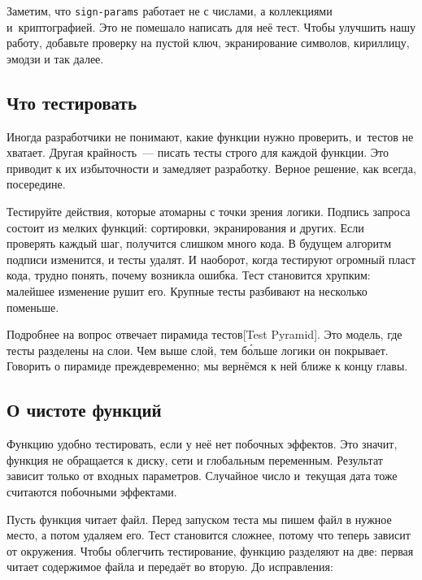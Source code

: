 Заметим, что \verb|sign-params| работает не с числами, а коллекциями
и~криптографией. Это не помешало написать для неё тест. Чтобы улучшить нашу
работу, добавьте проверку на пустой ключ, экранирование символов, кириллицу,
эмодзи и так далее.

\subsection{Что тестировать}

Иногда разработчики не понимают, какие функции нужно проверить, и~тестов не
хватает. Другая крайность~--- писать тесты строго для каждой функции. Это
приводит к их избыточности и замедляет разработку. Верное решение, как всегда,
посередине.

Тестируйте действия, которые атомарны с точки зрения логики. Подпись запроса
состоит из мелких функций: сортировки, экранирования и других. Если проверять
каждый шаг, получится слишком много кода. В будущем алгоритм подписи изменится,
и тесты удалят. И наоборот, когда тестируют огромный пласт кода, трудно понять,
почему возникла ошибка. Тест становится хрупким: малейшее изменение рушит
его. Крупные тесты разбивают на несколько поменьше.


Подробнее на вопрос отвечает пирамида
тестов[Test Pyramid].
Это модель, где тесты разделены на слои. Чем выше слой, тем б\'{о}льше логики он
покрывает. Говорить о пирамиде преждевременно; мы вернёмся к ней ближе к концу
главы.

\subsection{О чистоте функций}


Функцию удобно тестировать, если у неё нет побочных эффектов. Это значит,
функция не обращается к диску, сети и глобальным переменным. Результат зависит
только от входных параметров. Случайное число и~текущая дата тоже считаются
побочными эффектами.

Пусть функция читает файл. Перед запуском теста мы пишем файл в нужное место, а
потом удаляем его. Тест становится сложнее, потому что теперь зависит от
окружения. Чтобы облегчить тестирование, функцию разделяют на две: первая читает
содержимое файла и передаёт во вторую. До исправления:

